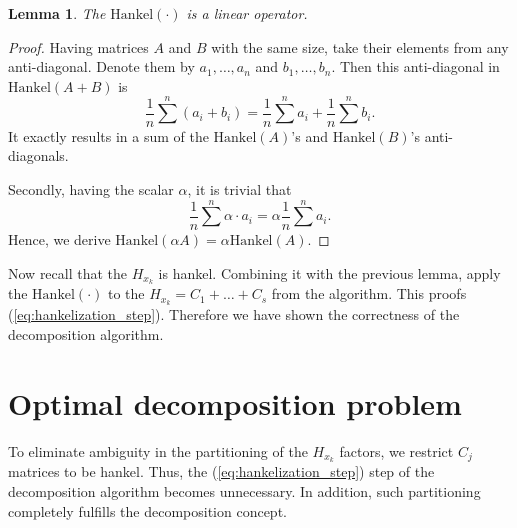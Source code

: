 \documentclass[referee, pdflatex, sn-mathphys-num]{sn-jnl}
\theoremstyle{definition}
\theoremstyle{plain}
\newtheorem{Lem}{Lemma}
\begin{document}
	\begin{Lem}
		The $ \text{Hankel}(\cdot) $ is a linear operator.
	\end{Lem}
	
	\begin{proof}		
		Having matrices $ A $ and $ B $ with the same size, take their elements from any anti-diagonal. Denote them by $ a_1, \ldots, a_n $ and $ b_1, \ldots, b_n $. Then this anti-diagonal in $ \text{Hankel}(A + B) $ is \begin{equation*}
			 \dfrac{1}{n} \sum\limits^n (a_i + b_i) = \dfrac{1}{n} \sum\limits^n a_i + \dfrac{1}{n} \sum\limits^n b_i.
		\end{equation*}	It exactly results in a sum of the $ \text{Hankel}(A) $'s and $ \text{Hankel}(B) $'s anti-diagonals.
		
		Secondly, having the scalar $ \alpha $, it is trivial that \begin{equation*}
			 \dfrac{1}{n} \sum\limits^n \alpha \cdot a_i = \alpha \dfrac{1}{n} \sum\limits^n a_i.
		\end{equation*}	Hence, we derive $ \text{Hankel}(\alpha A) = \alpha \text{Hankel}(A) $.
	\end{proof}
	
	Now recall that the $ H_{x_k} $ is hankel. Combining it with the previous lemma, apply the $ \text{Hankel}(\cdot) $ to the $ H_{x_k} = C_1 + \ldots + C_s $ from the algorithm. This proofs (\ref{eq:hankelization_step}). Therefore we have shown the correctness of the decomposition algorithm.
	
	\section{Optimal decomposition problem}\label{sec:optimal_decomp}
	
	To eliminate ambiguity in the partitioning of the $ H_{x_k} $ factors, we restrict $ C_j $ matrices to be hankel. Thus, the (\ref{eq:hankelization_step}) step of the decomposition algorithm becomes unnecessary. In addition, such partitioning completely fulfills the decomposition concept. 
	
\end{document}
